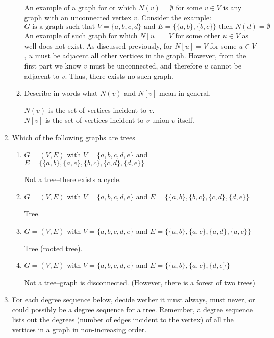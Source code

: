 \documentclass[11pt, letterpaper, includehead]{article}
\theoremstyle{plain}
\theoremstyle{mydefinition}
\theoremstyle{myproperty}
\begin{document}
\begin{enumerate}[label=\textbf{\arabic*}., leftmargin=*]
\begin{enumerate}[label=(\alph*)]
        An example of a graph for or which $N(v) = \emptyset$ for some $v \in V$ is any graph with an unconnected vertex $v$. Consider the example:
        \[G \text{ is a graph such that } V = \{a, b, c, d\} \text{ and } E = \{ \{a, b \}, \{b, c \}\} \text{ then } N(d) = \emptyset\]
        An example of such graph for which $N[u] = V$ for some other $u \in V$ as well does not exist. As discussed previously, for $N[u] = V$ for some $u \in V$, $u$ must be adjacent all other vertices in the graph. However, from the first part we know $v$ must be unconnected, and therefore $u$ cannot be adjacent to $v$. Thus, there exists no such graph.
        
        \item Describe in words what $N(v)$ and $N[v]$ mean in general.

        $N(v)$ is the set of vertices incident to $v$.\\
        $N[v]$ is the set of vertices incident to $v$ union $v$ itself.

    \end{enumerate}

    \item Which of the following graphs are trees
    \begin{enumerate}[label=(\alph*)]
        \item $G = (V, E)$ with $V = \{a, b, c, d, e\}$ and $E = \{ \{a, b \}, \{a, e \}, \{b, c \}, \{c, d \}, \{d, e\}\}$ 
        
        Not a tree--there exists a cycle.
        \item $G = (V, E)$ with $V = \{a, b, c, d, e\}$ and $E = \{ \{a, b \}, \{b, c \}, \{c, d \}, \{d, e \}\}$
        
        Tree.
        \item $G = (V, E)$ with $V = \{a, b, c, d, e\}$ and $E = \{ \{a, b \}, \{a, c \}, \{a, d \}, \{a, e \}\}$
        
        Tree (rooted tree).
        \item $G = (V, E)$ with $V = \{a, b, c, d, e\}$ and $E = \{ \{a, b \}, \{a, c \}, \{d, e \}\}$
        
        Not a tree--graph is disconnected. (However, there is a forest of two trees)
    \end{enumerate}

    \item For each degree sequence below, decide wether it must always, must never, or could possibly be a degree sequence for a tree. Remember, a degree sequence lists out the degrees (number of edges incident to the vertex) of all the vertices in a graph in non-increasing order.
    

\end{enumerate}
\end{document}
